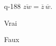 \begin{truefalse}{q-188}
$\overline{zw}= \overline z \, \overline w$.
\item* Vrai
\item Faux
\end{truefalse}

